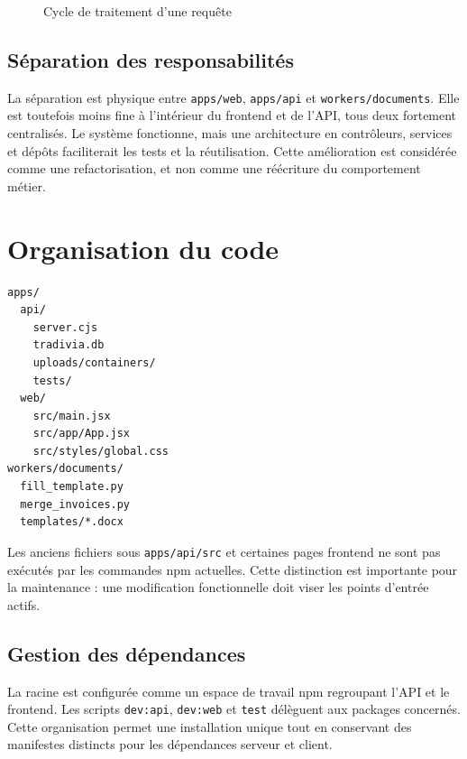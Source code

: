 \documentclass[12pt,a4paper,oneside]{report}
\newcommand{\code}[1]{\texttt{#1}}
\begin{document}
\begin{figure}[H]\centering
{}
\caption{Cycle de traitement d'une requête}
\end{figure}

\subsection{Séparation des responsabilités}
La séparation est physique entre \code{apps/web}, \code{apps/api} et \code{workers/documents}. Elle est toutefois moins fine à l'intérieur du frontend et de l'API, tous deux fortement centralisés. Le système fonctionne, mais une architecture en contrôleurs, services et dépôts faciliterait les tests et la réutilisation. Cette amélioration est considérée comme une refactorisation, et non comme une réécriture du comportement métier.

\section{Organisation du code}
\begin{lstlisting}[caption={Arborescence active simplifiée}]
apps/
  api/
    server.cjs
    tradivia.db
    uploads/containers/
    tests/
  web/
    src/main.jsx
    src/app/App.jsx
    src/styles/global.css
workers/documents/
  fill_template.py
  merge_invoices.py
  templates/*.docx
\end{lstlisting}

Les anciens fichiers sous \code{apps/api/src} et certaines pages frontend ne sont pas exécutés par les commandes npm actuelles. Cette distinction est importante pour la maintenance : une modification fonctionnelle doit viser les points d'entrée actifs.

\subsection{Gestion des dépendances}
La racine est configurée comme un espace de travail npm regroupant l'API et le frontend. Les scripts \code{dev:api}, \code{dev:web} et \code{test} délèguent aux packages concernés. Cette organisation permet une installation unique tout en conservant des manifestes distincts pour les dépendances serveur et client.
\end{document}
